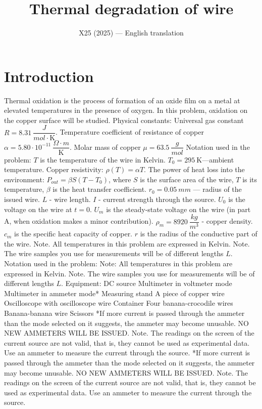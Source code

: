 \documentclass[11pt,a4paper]{article}
\title{\textbf{Thermal degradation of wire}}
\author{\normalsize X25 (2025) — English translation}
\date{}
\begin{document}
\maketitle
\section*{Introduction}
Thermal oxidation is the process of formation of an oxide film on a metal at elevated temperatures in the presence of oxygen. In this problem, oxidation on the copper surface will be studied.
Physical constants: Universal gas constant $R=8.31~\dfrac{J}{mol\cdot \mathrm{K}}$. Temperature coefficient of resistance of copper $\alpha = 5.80\cdot 10^{-11}~\dfrac{\Omega\cdot m}{\mathrm{K}}$. Molar mass of copper $\mu = 63.5~\dfrac{g}{mol}$ Notation used in the problem: $T$ is the temperature of the wire in Kelvin. $T_0=295~\mathrm{K}$—ambient temperature. Copper resistivity: $\rho (T) = \alpha T$. The power of heat loss into the environment: $P_{out} = \beta S (T- T_0)$, where $S$ is the surface area of the wire, $T$ is its temperature, $\beta $ is the heat transfer coefficient. $r_0=0.05~mm$ — radius of the issued wire. $L$ - wire length. $I$ - current strength through the source. $U_0$ is the voltage on the wire at $t=0$. $U_m$ is the steady-state voltage on the wire (in part A, when oxidation makes a minor contribution). $\rho_{m} = 8920~\dfrac{kg}{m^3}$ - copper density. $c_{m}$ is the specific heat capacity of copper. $r$ is the radius of the conductive part of the wire. Note. All temperatures in this problem are expressed in Kelvin. Note. The wire samples you use for measurements will be of different lengths $L$.
Notation used in the problem:
Note: All temperatures in this problem are expressed in Kelvin.
Note. The wire samples you use for measurements will be of different lengths $L$.
Equipment: DC source Multimeter in voltmeter mode Multimeter in ammeter mode* Measuring stand A piece of copper wire Oscilloscope with oscilloscope wire Container Four banana-crocodile wires Banana-banana wire Scissors *If more current is passed through the ammeter than the mode selected on it suggests, the ammeter may become unusable. NO NEW AMMETERS WILL BE ISSUED. Note. The readings on the screen of the current source are not valid, that is, they cannot be used as experimental data. Use an ammeter to measure the current through the source.
*If more current is passed through the ammeter than the mode selected on it suggests, the ammeter may become unusable. NO NEW AMMETERS WILL BE ISSUED.
Note. The readings on the screen of the current source are not valid, that is, they cannot be used as experimental data. Use an ammeter to measure the current through the source.
\end{document}
